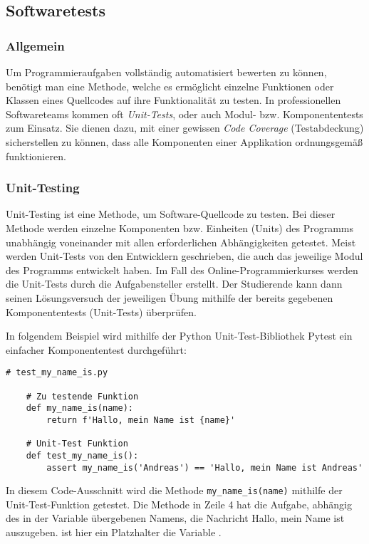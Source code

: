 \subsection{Softwaretests}
\subsubsection{Allgemein}
Um Programmieraufgaben vollständig automatisiert bewerten zu können, benötigt
man eine Methode, welche es ermöglicht einzelne Funktionen oder Klassen eines
Quellcodes auf ihre Funktionalität zu testen. In professionellen Softwareteams
kommen oft \emph{Unit-Tests}, oder auch Modul- bzw. Komponententests zum
Einsatz. Sie dienen dazu, mit einer gewissen \emph{Code Coverage}
(Testabdeckung) sicherstellen zu können, dass alle Komponenten einer Applikation
ordnungsgemäß funktionieren.

\subsubsection{Unit-Testing}\label{unit-tests}
Unit-Testing ist eine Methode, um Software-Quellcode zu testen. Bei dieser
Methode werden einzelne Komponenten bzw. Einheiten (Units) des Programms
unabhängig voneinander mit allen erforderlichen Abhängigkeiten getestet. Meist
werden Unit-Tests von den Entwicklern geschrieben, die auch das jeweilige
Modul des Programms entwickelt haben. Im Fall des Online-Programmierkurses
werden die Unit-Tests durch die Aufgabensteller erstellt. Der Studierende kann
dann seinen Lösungsversuch der jeweiligen Übung mithilfe der bereits gegebenen
Komponententests (Unit-Tests) überprüfen. \parencite{unit-test}

In folgendem Beispiel wird mithilfe der Python Unit-Test-Bibliothek Pytest
ein einfacher Komponententest durchgeführt:

\begin{lstlisting}[style=Python]
    # test_my_name_is.py

    # Zu testende Funktion
    def my_name_is(name):
        return f'Hallo, mein Name ist {name}'

    # Unit-Test Funktion
    def test_my_name_is():
        assert my_name_is('Andreas') == 'Hallo, mein Name ist Andreas'
\end{lstlisting}

In diesem Code-Ausschnitt wird die Methode \texttt{my\_name\_is(name)} mithilfe
der Unit-Test-Funktion  getestet. Die Methode 
 in Zeile 4 hat die Aufgabe, abhängig des in der
Variable  übergebenen Namens, die Nachricht \glqq Hallo, mein Name
ist \grqq{} auszugeben.  ist hier ein Platzhalter
die Variable .

